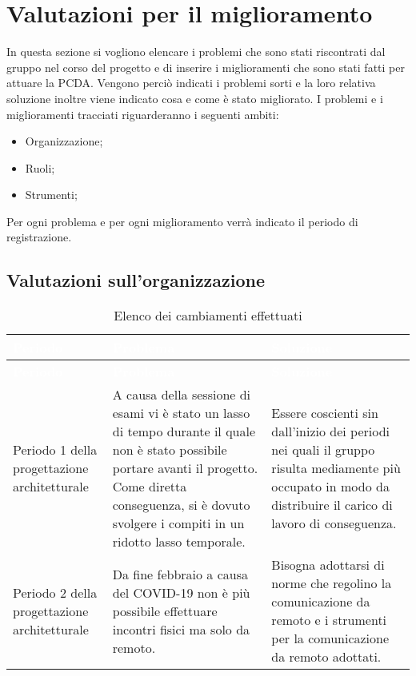 \section{Valutazioni per il miglioramento}
In questa sezione si vogliono elencare i problemi che sono stati riscontrati dal gruppo nel corso del progetto e di inserire i miglioramenti che sono stati fatti per attuare la PCDA. Vengono perciò indicati i problemi sorti e la loro relativa soluzione inoltre viene indicato cosa e come è stato migliorato.
I problemi e i miglioramenti tracciati riguarderanno i seguenti ambiti:
\begin{itemize}
\item Organizzazione;
\item Ruoli;
\item Strumenti;
\end{itemize}
Per ogni problema e per ogni miglioramento verrà indicato il periodo di registrazione.

\subsection{Valutazioni sull'organizzazione}
{
	\renewcommand{\arraystretch}{1.5}
	\centering
	\begin{longtable}{ C{3cm} C{5.5cm} C{5.5cm}}
		\caption{Elenco dei cambiamenti effettuati}\\
		\textcolor{white}{\textbf{Periodo}} & \textcolor{white}{\textbf{Problema}} & \textcolor{white}{\textbf{Soluzione}}\\
		\endfirsthead
		\textcolor{white}{\textbf{Periodo}} & \textcolor{white}{\textbf{Problema}} & \textcolor{white}{\textbf{Soluzione}}\\
		\endhead
		Periodo 1 della progettazione architetturale & A causa della sessione di esami vi è stato un lasso di tempo durante il quale non è stato possibile portare avanti il progetto. Come diretta conseguenza, si è dovuto svolgere i compiti in un ridotto lasso temporale. & Essere coscienti sin dall'inizio dei periodi nei quali il gruppo risulta mediamente più occupato in modo da distribuire il carico di lavoro di conseguenza. \\
		
		Periodo 2 della progettazione architetturale & Da fine febbraio a causa del COVID-19 non è più possibile effettuare incontri fisici ma solo da remoto. & Bisogna adottarsi di norme che regolino la comunicazione da remoto e i strumenti per la comunicazione da remoto adottati. \\
		
	\end{longtable}
}


